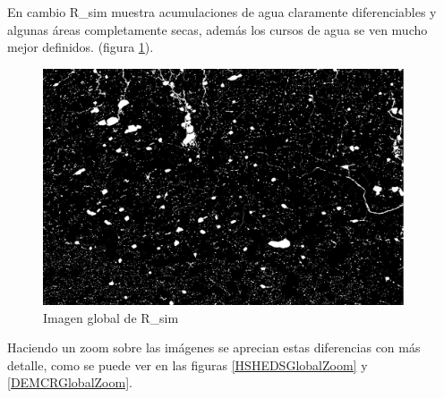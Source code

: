 \documentclass[10pt,a4paper, twoside]{report}
\begin{document}
En cambio R\_sim muestra acumulaciones de agua claramente diferenciables y algunas áreas completamente secas, además los cursos de agua se ven mucho mejor definidos. (figura \ref{DEMCRGlobal}).

\begin{figure}[!htb]
   \centering      
   \includegraphics[width=0.95\textwidth]{imagenes/DEMCRGlobal.jpg}
 \caption{Imagen global de R\_sim}
 \label{DEMCRGlobal}
\end{figure}

Haciendo un zoom sobre las imágenes se aprecian estas diferencias con más detalle, como se puede ver en las figuras \ref{HSHEDSGlobalZoom} y \ref{DEMCRGlobalZoom}.
\end{document}
